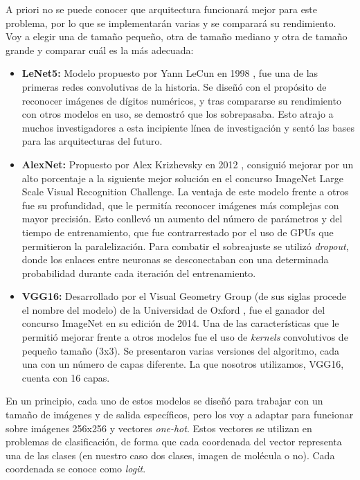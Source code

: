 A priori no se puede conocer que arquitectura funcionará mejor para este problema, por lo que se implementarán varias y se comparará su rendimiento. Voy a elegir una de tamaño pequeño, otra de tamaño mediano y otra de tamaño grande y comparar cuál es la más adecuada:
\begin{itemize}
    \item \textbf{LeNet5:} Modelo propuesto por Yann LeCun en 1998 \cite{lecun1998gradient}, fue una de las primeras redes convolutivas de la historia. Se diseñó con el propósito de reconocer imágenes de dígitos numéricos, y tras compararse su rendimiento con otros modelos en uso, se demostró que los sobrepasaba. Esto atrajo a muchos investigadores a esta incipiente línea de investigación y sentó las bases para las arquitecturas del futuro.
    \item \textbf{AlexNet:} Propuesto por Alex Krizhevsky en 2012 \cite{krizhevsky2012imagenet}, consiguió mejorar por un alto porcentaje a la siguiente mejor solución en el concurso ImageNet Large Scale Visual Recognition Challenge. La ventaja de este modelo frente a otros fue su profundidad, que le permitía reconocer imágenes más complejas con mayor precisión. Esto conllevó un aumento del número de parámetros y del tiempo de entrenamiento, que fue contrarrestado por el uso de GPUs que permitieron la paralelización. Para combatir el sobreajuste se utilizó \textit{dropout}, donde los enlaces entre neuronas se desconectaban con una determinada probabilidad durante cada iteración del entrenamiento.
    \item \textbf{VGG16:} Desarrollado por el Visual Geometry Group (de sus siglas procede el nombre del modelo) de la Universidad de Oxford \cite{https://doi.org/10.48550/arxiv.1409.1556}, fue el ganador del concurso ImageNet en su edición de 2014. Una de las características que le permitió mejorar frente a otros modelos fue el uso de \textit{kernels} convolutivos de pequeño tamaño (3x3). Se presentaron varias versiones del algoritmo, cada una con un número de capas diferente. La que nosotros utilizamos, VGG16, cuenta con 16 capas.
\end{itemize}

En un principio, cada uno de estos modelos se diseñó para trabajar con un tamaño de imágenes y de salida específicos, pero los voy a adaptar para funcionar sobre imágenes 256x256 y vectores \textit{one-hot}. Estos vectores se utilizan en problemas de clasificación, de forma que cada coordenada del vector representa una de las clases (en nuestro caso dos clases, imagen de molécula o no). Cada coordenada se conoce como \textit{logit}.


